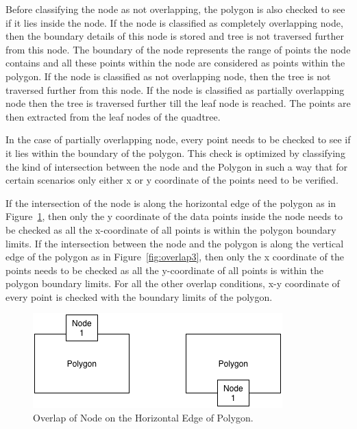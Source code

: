 Before classifying the node as not overlapping, the polygon is also checked to see if it lies inside the node. If the node is classified as completely overlapping node, then the boundary details of this node is stored and tree is not traversed further from this node. The boundary of the node represents the range of points the node contains and all these points within the node are considered as points within the polygon.
If the node is classified as not overlapping node, then the tree is not traversed further from this node. 
If the node is classified as partially overlapping  node then the tree is traversed further till the leaf node is reached. The points are then extracted from the leaf nodes of the quadtree.

In the case of partially overlapping node, every point needs to be checked to see if it lies within the boundary of the polygon. This check is optimized by classifying the kind of intersection between the node  and the Polygon in such a way that for certain scenarios only either x or y coordinate of the points need to be verified. 

If the intersection of the node is along the horizontal edge of the polygon as in Figure~\ref{fig:overlap2}, then only the y coordinate of the data points inside the node needs to be checked as all the x-coordinate of all points is within the polygon boundary limits. If the intersection between the node and the polygon is along the vertical edge of the polygon as in Figure~\ref{fig:overlap3}, then only the x coordinate of the points needs to be checked as all the y-coordinate of all points is within the polygon boundary limits. For all the other overlap conditions, x-y coordinate of every point is checked with the boundary limits of the polygon.

\begin{figure}[H]
\centering
\vspace{0.5in}
\includegraphics[scale=0.8]{Images/OverlapScenario4}
\vspace{0.5in}
\caption{Overlap of Node on the Horizontal Edge of Polygon.}
\label{fig:overlap2}
\end{figure}

